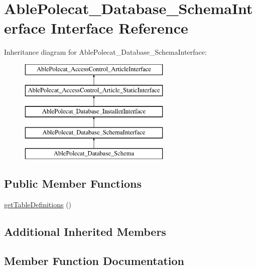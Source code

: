 \hypertarget{interface_able_polecat___database___schema_interface}{}\section{Able\+Polecat\+\_\+\+Database\+\_\+\+Schema\+Interface Interface Reference}
\label{interface_able_polecat___database___schema_interface}
Inheritance diagram for Able\+Polecat\+\_\+\+Database\+\_\+\+Schema\+Interface\+:\begin{figure}[H]
\begin{center}
\leavevmode
\includegraphics[height=5.000000cm]{interface_able_polecat___database___schema_interface}
\end{center}
\end{figure}
\subsection*{Public Member Functions}
\begin{DoxyCompactItemize}
\item 
\hyperlink{interface_able_polecat___database___schema_interface_a73aa038e374cfd590b1605a541498eb0}{get\+Table\+Definitions} ()
\end{DoxyCompactItemize}
\subsection*{Additional Inherited Members}


\subsection{Member Function Documentation}
\hypertarget{interface_able_polecat___database___schema_interface_a73aa038e374cfd590b1605a541498eb0}{}
